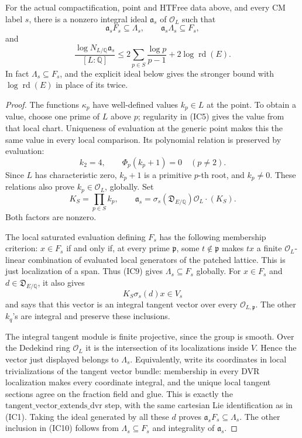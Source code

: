 \begin{srproposition}\label{prop:sr-actual-integral-eigenlattice}
For the actual compactification, point and
\(\mathrm{HTFree}\) data above, and every CM label \(s\),
there is a nonzero integral ideal \(\mathfrak a_s\)
of \(\mathcal O_L\) such that
\[
             \mathfrak a_s F_s\subseteq\Lambda_s,\qquad
             \mathfrak a_s\Lambda_s\subseteq F_s,
 \tag{IC10}
\]
and
\[
 \frac{\log N_{L/\mathbb Q}\mathfrak a_s}{[L:\mathbb Q]}
       \le
       2\sum_{p\in S}\frac{\log p}{p-1}
                              +2\log\operatorname{rd}(E).
 \tag{IC11}
\]
In fact \(\Lambda_s\subseteq F_s\), and the explicit
ideal below gives the stronger bound with
\(\log\operatorname{rd}(E)\) in place of its twice.
\end{srproposition}
\begin{proof}
The functions \(\kappa_p\) have well-defined values
\(k_p\in L\) at the point. To obtain a value, choose
one prime of \(L\) above \(p\); regularity in (IC5)
gives the value from that local chart.
Uniqueness of evaluation at the generic point makes
this the same value in every local comparison.
Its polynomial relation is preserved by evaluation:
\[
       k_2=4,\qquad
                  \Phi_p(k_p+1)=0\quad(p\ne2).
 \tag{IC12}
\]
Since \(L\) has characteristic zero, \(k_p+1\) is a
primitive \(p\)-th root, and \(k_p\ne0\).
These relations also prove
\(k_p\in\mathcal O_L\), globally.
Set
\[
 K_S=\prod_{p\in S}k_p,\qquad
 \mathfrak a_s=
    \sigma_s(\mathfrak D_{E/\mathbb Q})\mathcal O_L
                                      \cdot(K_S).
 \tag{IC13}
\]
Both factors are nonzero.

The local saturated evaluation defining \(F_s\)
has the following membership criterion:
\(x\in F_s\) if and only if, at every prime
\(\mathfrak p\), some \(t\notin\mathfrak p\)
makes \(tx\) a finite
\(\mathcal O_L\)-linear combination of evaluated
local generators of the patched lattice.
This is just localization of a span.
Thus (IC9) gives
\(\Lambda_s\subseteq F_s\) globally.
For \(x\in F_s\) and
\(d\in\mathfrak D_{E/\mathbb Q}\), it also gives
\[
                           K_S\sigma_s(d)x\in V_s
\]
and says that this vector is an integral tangent
vector over every \(\mathcal O_{L,\mathfrak p}\).
The other \(k_q\)'s are integral and preserve
these inclusions.

The integral tangent module is finite projective,
since the group is smooth.
Over the Dedekind ring \(\mathcal O_L\) it is the
intersection of its localizations inside \(V\).
Hence the vector just displayed belongs to
\(\Lambda_s\).
Equivalently, write its coordinates in local
trivializations of the tangent vector bundle:
membership in every DVR localization makes every
coordinate integral, and the unique local tangent
sections agree on the fraction field and glue.
This is exactly the
\(\mathrm{tangent\_vector\_extends\_dvr}\)
step, with the same cartesian Lie identification
as in (IC1).
Taking the ideal generated by all these \(d\)
proves \(\mathfrak a_sF_s\subseteq\Lambda_s\).
The other inclusion in (IC10) follows from
\(\Lambda_s\subseteq F_s\) and integrality of
\(\mathfrak a_s\).


\end{proof}
